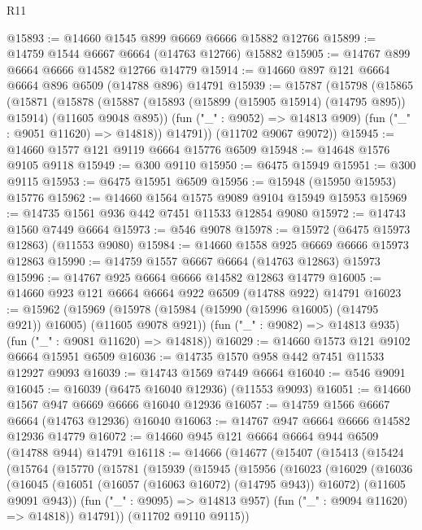 \begin{lexlean}{R11}
\begin{coremodule}
{{{{{{{{{{{{{{{{{{{{{{{{{{{{{{{{{{{{{{{{{{{{{{{{{{{{{{{{{{{{{{{{{{{{{{{{{{{{{{{{{{@15893 := @14660 @1545 @899 @6669 @6666 @15882 @12766
@15899 := @14759 @1544 @6667 @6664 (@14763 @12766) @15882
@15905 := @14767 @899 @6664 @6666 @14582 @12766 @14779
@15914 := @14660 @897 @121 @6664 @6664 @896 @6509 (@14788 @896) @14791
@15939 := @15787
    (@15798
      (@15865
        (@15871
          (@15878
            (@15887 (@15893 (@15899 (@15905 @15914) (@14795 @895)) @15914) (@11605 @9048 @895))
            (fun ("_" : @9052) => @14813 @909)
            (fun ("_" : @9051 @11620) => @14818))
          @14791))
      (@11702 @9067 @9072))
@15945 := @14660 @1577 @121 @9119 @6664 @15776 @6509
@15948 := @14648 @1576 @9105 @9118
@15949 := @300 @9110
@15950 := @6475 @15949
@15951 := @300 @9115
@15953 := @6475 @15951 @6509
@15956 := @15948 (@15950 @15953) @15776
@15962 := @14660 @1564 @1575 @9089 @9104 @15949 @15953
@15969 := @14735 @1561 @936 @442 @7451 @11533 @12854 @9080
@15972 := @14743 @1560 @7449 @6664
@15973 := @546 @9078
@15978 := @15972 (@6475 @15973 @12863) (@11553 @9080)
@15984 := @14660 @1558 @925 @6669 @6666 @15973 @12863
@15990 := @14759 @1557 @6667 @6664 (@14763 @12863) @15973
@15996 := @14767 @925 @6664 @6666 @14582 @12863 @14779
@16005 := @14660 @923 @121 @6664 @6664 @922 @6509 (@14788 @922) @14791
@16023 := @15962
    (@15969
      (@15978 (@15984 (@15990 (@15996 @16005) (@14795 @921)) @16005) (@11605 @9078 @921))
      (fun ("_" : @9082) => @14813 @935)
      (fun ("_" : @9081 @11620) => @14818))
@16029 := @14660 @1573 @121 @9102 @6664 @15951 @6509
@16036 := @14735 @1570 @958 @442 @7451 @11533 @12927 @9093
@16039 := @14743 @1569 @7449 @6664
@16040 := @546 @9091
@16045 := @16039 (@6475 @16040 @12936) (@11553 @9093)
@16051 := @14660 @1567 @947 @6669 @6666 @16040 @12936
@16057 := @14759 @1566 @6667 @6664 (@14763 @12936) @16040
@16063 := @14767 @947 @6664 @6666 @14582 @12936 @14779
@16072 := @14660 @945 @121 @6664 @6664 @944 @6509 (@14788 @944) @14791
@16118 := @14666
    (@14677
      (@15407
        (@15413
          (@15424
            (@15764
              (@15770
                (@15781
                  (@15939
                    (@15945
                      (@15956
                        (@16023
                          (@16029
                            (@16036
                              (@16045
                                (@16051 (@16057 (@16063 @16072) (@14795 @943)) @16072)
                                (@11605 @9091 @943))
                              (fun ("_" : @9095) => @14813 @957)
                              (fun ("_" : @9094 @11620) => @14818))
                            @14791))
                        (@11702 @9110 @9115))
}}}}}}}}}}}}}}}}}}}}}}}}}}}}}}}}}}}}}}}}}}}}}}}}}}}}}}}}}}}}}}}}}}}}}}}}}}}}}}}}}}
\end{coremodule}
\end{lexlean}
